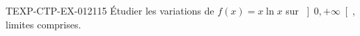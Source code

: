 \begin{exercice}{TEXP-CTP-EX-012}{1}{15}
Étudier les variations de $f(x) = x\ln x$ sur $\left]0, +\infty\right[$, limites comprises.

\end{exercice}
